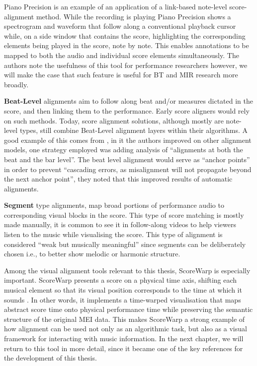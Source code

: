 Piano Precision is an example of an application of a link-based note-level score-alignment method. While the recording is playing Piano Precision shows a spectrogram and waveform that follow along a conventional playback cursor while, on a side window that contains the score, highlighting the corresponding elements being played in the score, note by note. This enables annotations to be mapped to both the audio and individual score elements simultaneously. The authors note the usefulness of this tool for performance researchers \cite{jiangPIANOPRECISIONADVANCING2025} however, we will make the case that such feature is useful for BT and MIR research more broadly.

\textbf{Beat-Level} alignments aim to follow along beat and/or measures dictated in the score, and then linking them to the performance. Early score aligners \cite{duanSoundprismOnlineSystem2011} would rely on such methods. Today, score alignment solutions, although mostly are note-level types, still combine Beat-Level alignment layers within their algorithms. A good example of this comes from \cite{peterAutomaticNoteLevelScoretoPerformance2023}, in it the authors improved on other alignment models, one strategy employed was adding analysis of ``alignments at both the beat and the bar level''. The beat level alignment would serve as ``anchor points'' in order to prevent ``cascading errors, as misalignment will not propagate beyond the next anchor point'', they noted that this improved results of automatic alignments.

\textbf{Segment} type alignments, map broad portions of performance audio to corresponding visual blocks in the score. This type of score matching is mostly made manually, it is common to see it in follow-along videos to help viewers listen to the music while visualising the score. This type of alignment is considered ``weak but musically meaningful'' \cite{jungUnifiedCrossmodalTranslation2026a} since segments can be deliberately chosen i.e., to better show melodic or harmonic structure.

Among the visual alignment tools relevant to this thesis, ScoreWarp is especially important. ScoreWarp presents a score on a physical time axis, shifting each musical element so that its visual position corresponds to the time at which it sounds \cite{goeblLetsScoreWarpAgain2025a}. In other words, it implements a time-warped visualisation that maps abstract score time onto physical performance time while preserving the semantic structure of the original MEI data. This makes ScoreWarp a strong example of how alignment can be used not only as an algorithmic task, but also as a visual framework for interacting with music information. In the next chapter, we will return to this tool in more detail, since it became one of the key references for the development of this thesis.

